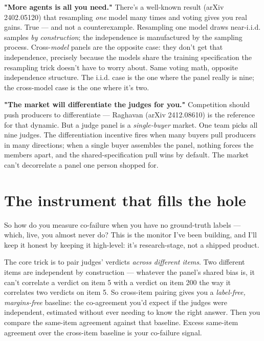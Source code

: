 \documentclass[11pt]{article}
\begin{document}
\textbf{"More agents is all you need."} There's a well-known result (arXiv 2402.05120) that resampling \emph{one} model many times and voting gives you real gains. True — and not a counterexample. Resampling one model draws near-i.i.d. samples \emph{by construction}; the independence is manufactured by the sampling process. Cross-\emph{model} panels are the opposite case: they don't get that independence, precisely because the models share the training specification the resampling trick doesn't have to worry about. Same voting math, opposite independence structure. The i.i.d. case is the one where the panel really is nine; the cross-model case is the one where it's two.

\textbf{"The market will differentiate the judges for you."} Competition should push producers to differentiate — Raghavan (arXiv 2412.08610) is the reference for that dynamic. But a judge panel is a \emph{single-buyer} market. One team picks all nine judges. The differentiation incentive fires when many buyers pull producers in many directions; when a single buyer assembles the panel, nothing forces the members apart, and the shared-specification pull wins by default. The market can't decorrelate a panel one person shopped for.

\section*{The instrument that fills the hole}

So how do you measure co-failure when you have no ground-truth labels — which, live, you almost never do? This is the monitor I've been building, and I'll keep it honest by keeping it high-level: it's research-stage, not a shipped product.

The core trick is to pair judges' verdicts \emph{across different items}. Two different items are independent by construction — whatever the panel's shared bias is, it can't correlate a verdict on item 5 with a verdict on item 200 the way it correlates two verdicts on item 5. So cross-item pairing gives you a \emph{label-free, margins-free} baseline: the co-agreement you'd expect if the judges were independent, estimated without ever needing to know the right answer. Then you compare the same-item agreement against that baseline. Excess same-item agreement over the cross-item baseline is your co-failure signal.
\end{document}
